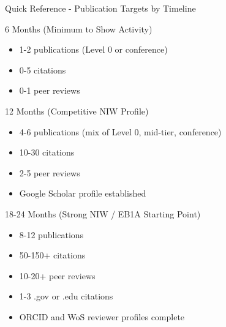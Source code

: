 \documentclass[11pt]{beamer}
\begin{document}
				\begin{frame}{Quick Reference - Publication Targets by Timeline}
					\scriptsize
					\begin{block}{6 Months (Minimum to Show Activity)}
						\begin{itemize}
							\item 1-2 publications (Level 0 or conference)
							\item 0-5 citations
							\item 0-1 peer reviews
						\end{itemize}
					\end{block}
					\begin{block}{12 Months (Competitive NIW Profile)}
						\begin{itemize}
							\item 4-6 publications (mix of Level 0, mid-tier, conference)
							\item 10-30 citations
							\item 2-5 peer reviews
							\item Google Scholar profile established
						\end{itemize}
					\end{block}
					\begin{block}{18-24 Months (Strong NIW / EB1A Starting Point)}
						\begin{itemize}
							\item 8-12 publications
							\item 50-150+ citations
							\item 10-20+ peer reviews
							\item 1-3 .gov or .edu citations
							\item ORCID and WoS reviewer profiles complete
						\end{itemize}
					\end{block}
				\end{frame}
				
\end{document}
